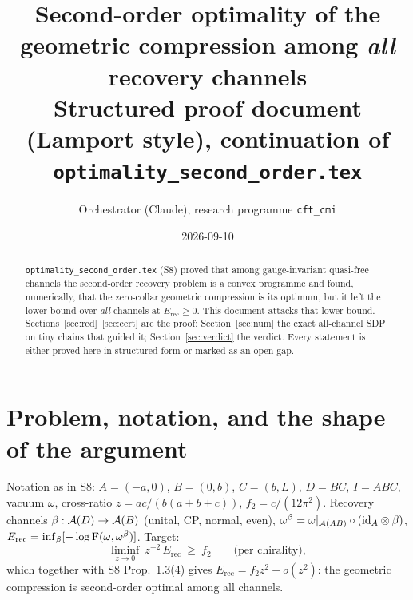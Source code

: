 \documentclass[11pt,a4paper]{article}
\title{Second-order optimality of the geometric compression among \emph{all} recovery channels\\
\large Structured proof document (Lamport style), continuation of \texttt{optimality\_second\_order.tex}}
\author{Orchestrator (Claude), research programme \texttt{cft\_cmi}}
\date{2026-09-10}
\newcommand{\Erec}{E_{\mathrm{rec}}}\newcommand{\Krec}{\mathcal K_{\mathrm{rec}}}
\begin{document}
\maketitle
\begin{abstract}
\noindent \texttt{optimality\_second\_order.tex} (S8) proved that among gauge-invariant
quasi-free channels the second-order recovery problem is a convex programme and found,
numerically, that the zero-collar geometric compression is its optimum, but it left the
lower bound over \emph{all} channels at \(\Erec\ge0\).  This document attacks that lower
bound.  Sections~\ref{sec:red}--\ref{sec:cert} are the proof; Section~\ref{sec:num} the
exact all-channel SDP on tiny chains that guided it; Section~\ref{sec:verdict} the verdict.
Every statement is either proved here in structured form or marked as an open gap.
\end{abstract}
\tableofcontents

\section{Problem, notation, and the shape of the argument}\label{sec:intro}
Notation as in S8: \(A=(-a,0)\), \(B=(0,b)\), \(C=(b,L)\), \(D=BC\), \(I=ABC\), vacuum
\(\omega\), cross-ratio \(z=ac/(b(a+b+c))\), \(f_2=c/(12\pi^2)\).  Recovery channels
\(\beta:\mathcal A(D)\to\mathcal A(B)\) (unital, CP, normal, even), \(\omega^\beta=\omega|_{\mathcal A(AB)}\circ(\mathrm{id}_A\otimes\beta)\),
\(\Erec=\inf_\beta[-\log\Fid(\omega,\omega^\beta)]\).  Target:
\begin{equation}\label{eq:target}
 \liminf_{z\to0}\ z^{-2}\,\Erec\ \ge\ f_2\qquad\text{(per chirality)},
\end{equation}
which together with S8 Prop.~1.3(4) gives \(\Erec=f_2z^2+o(z^2)\): the geometric compression
is second-order optimal among all channels.
\end{document}
